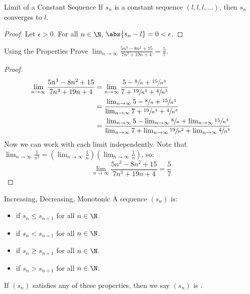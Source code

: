 \begin{lembox}{Limit of a Constant Sequence}{}
    If $s_n$ is a constant sequence $(l, l, l, \ldots)$, then $s_n$ converges to $l$.
    \tcblower
    \begin{proof}
        Let $\epsilon > 0$. For all $n \in \N$, $\abs{s_n - l} = 0 < \epsilon$.
    \end{proof}
\end{lembox}

\begin{exbox}{Using the Properties}{}
    Prove $\lim_{n \to \infty} \frac{5n^3 - 8n^2 + 15}{7n^3 + 19n + 4} = \frac{5}{7}$.
    \tcblower
    \begin{proof}
        \begin{align*}
            \lim_{n \to \infty} \frac{5n^3 - 8n^2 + 15}{7n^3 + 19n + 4}
            &= \lim_{n \to \infty} \frac{5 - \sfrac{8}{n} + \sfrac{15}{n^3}}{7 + \sfrac{19}{n^2} + \sfrac{4}{n^3}} \\
            &= \frac{\lim_{n \to \infty} 5 - \sfrac{8}{n} + \sfrac{15}{n^3} }{\lim_{n \to \infty} 7 + \sfrac{19}{n^2} + \sfrac{4}{n^3}} \\
            &= \frac{ \lim_{n \to \infty} 5 - \lim_{n \to \infty} \sfrac{8}{n} + \lim_{n \to \infty} \sfrac{15}{n^3} }{ \lim_{n \to \infty} 7 + \lim_{n \to \infty} \sfrac{19}{n^2} + \lim_{n \to \infty} \sfrac{4}{n^3} }
        \end{align*}
        Now we can work with each limit independently. Note that $\lim_{n \to \infty} \frac{1}{n^2} = \left( \lim_{n \to \infty} \frac{1}{n} \right) \left( \lim_{n \to \infty} \frac{1}{n} \right)$, so:
        \[ \lim_{n \to \infty} \frac{5n^3 - 8n^2 + 15}{7n^3 + 19n + 4} = \frac{5}{7} \]
    \end{proof}
\end{exbox}

\begin{dfnbox}{Increasing, Decreasing, Monotonic}{}
    A sequence $(s_n)$ is:
    \begin{itemize}[noitemsep]
        \item {} if $s_n \leq s_{n+1}$ for all $n \in \N$.
        \item {} if $s_n < s_{n+1}$ for all $n \in \N$.
        \item {} if $s_n \geq s_{n+1}$ for all $n \in \N$.
        \item {} if $s_n > s_{n+1}$ for all $n \in \N$.
    \end{itemize}
    If $(s_n)$ satisfies any of these properties, then we say $(s_n)$ is .
\end{dfnbox}

